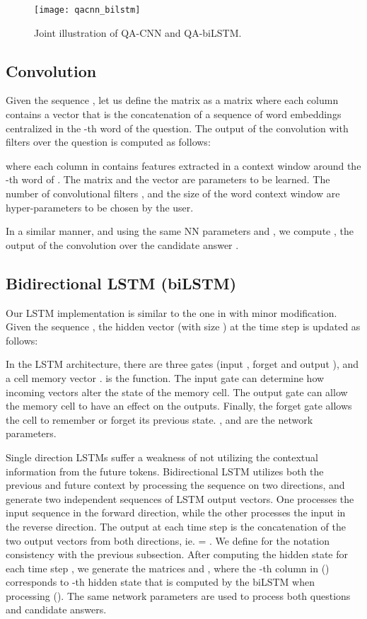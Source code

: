 \documentclass{article}
\begin{document}
\begin{figure}[ht]
\vskip 0.2in
\begin{center}
\centerline{\texttt{[image: qacnn\_bilstm]}}
\caption{Joint illustration of QA-CNN and QA-biLSTM.}
\label{qacnn}
\end{center}
\vskip -0.2in
\end{figure}

\subsection{Convolution}
Given the sequence ,
let us define the matrix  as a matrix where each column contains a vector  that is the concatenation of a sequence of  word embeddings centralized in the -th word of the question.
The output of the convolution with  filters over the question  is computed as follows:

where each column  in  contains features extracted in a context window around the -th word of .
The matrix  and the vector  are parameters to be learned.
The number of convolutional filters ,
and the size of the word context window 
are hyper-parameters to be chosen by the user.

In a similar manner,
and using the same NN parameters  and ,
we compute , 
the output of the convolution over the candidate answer .


\subsection{Bidirectional LSTM (biLSTM)}
Our LSTM implementation is similar to the one in \cite{graves2013} with minor modification. Given the sequence , 
the hidden vector  (with size ) at the time step  is updated as follows:  



In the LSTM architecture, there are three gates
(input , forget  and output ), and a cell memory vector . 
 is the  function. The input gate can determine how incoming vectors  alter the state of the memory cell. The output gate can allow the memory cell to have an effect on the outputs. Finally, the forget gate allows the cell to remember or forget its previous state.
,  and  are the network parameters. 

Single direction LSTMs suffer a weakness of not utilizing the contextual information from the future tokens. Bidirectional LSTM utilizes both the previous and future context by processing the sequence on two directions, and generate two independent sequences of LSTM output vectors. One processes the input sequence in the forward direction, while
the other processes the input in the reverse direction.
The output at each time step is the concatenation of the two output vectors from both directions, ie.  = .
We define  for the notation consistency with the previous subsection.
After computing the hidden state  for each time step , we generate the matrices   and  ,
where the -th column in  () corresponds to -th hidden state  that is computed by the biLSTM when processing  (). 
The same network parameters are used to process both questions and candidate answers. 
\end{document}

